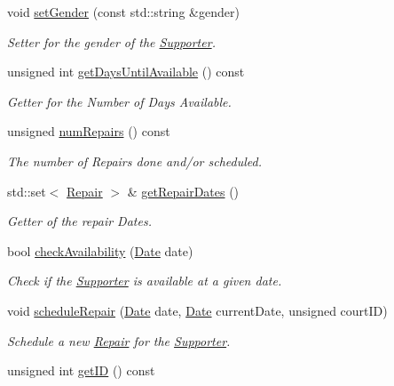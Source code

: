 \begin{DoxyCompactItemize}
void \mbox{\hyperlink{class_supporter_a34cd6cd2dce3597b8e03fd01f21dbd54}{set\+Gender}} (const std\+::string \&gender)
\begin{DoxyCompactList}\small\item\em Setter for the gender of the \mbox{\hyperlink{class_supporter}{Supporter}}. \end{DoxyCompactList}\item 
unsigned int \mbox{\hyperlink{class_supporter_ab7be7b4977d11b17e42781f0cd901ea2}{get\+Days\+Until\+Available}} () const
\begin{DoxyCompactList}\small\item\em Getter for the Number of Days Available. \end{DoxyCompactList}\item 
unsigned \mbox{\hyperlink{class_supporter_aee39413490bb66dc13fd3b96e7d87a81}{num\+Repairs}} () const
\begin{DoxyCompactList}\small\item\em The number of Repairs done and/or scheduled. \end{DoxyCompactList}\item 
std\+::set$<$ \mbox{\hyperlink{class_repair}{Repair}} $>$ \& \mbox{\hyperlink{class_supporter_a8fd8a2c698c2ae3979640a213001c20b}{get\+Repair\+Dates}} ()
\begin{DoxyCompactList}\small\item\em Getter of the repair Dates. \end{DoxyCompactList}\item 
bool \mbox{\hyperlink{class_supporter_abc9023e59feac7f460aac0d182d3175d}{check\+Availability}} (\mbox{\hyperlink{class_date}{Date}} date)
\begin{DoxyCompactList}\small\item\em Check if the \mbox{\hyperlink{class_supporter}{Supporter}} is available at a given date. \end{DoxyCompactList}\item 
void \mbox{\hyperlink{class_supporter_ac2880af1ce791e1d05cde3d63e754137}{schedule\+Repair}} (\mbox{\hyperlink{class_date}{Date}} date, \mbox{\hyperlink{class_date}{Date}} current\+Date, unsigned court\+ID)
\begin{DoxyCompactList}\small\item\em Schedule a new \mbox{\hyperlink{class_repair}{Repair}} for the \mbox{\hyperlink{class_supporter}{Supporter}}. \end{DoxyCompactList}\item 
unsigned int \mbox{\hyperlink{class_supporter_a2b9a149408035ca7e3732ae2cb14fdd1}{get\+ID}} () const

\end{DoxyCompactItemize}
